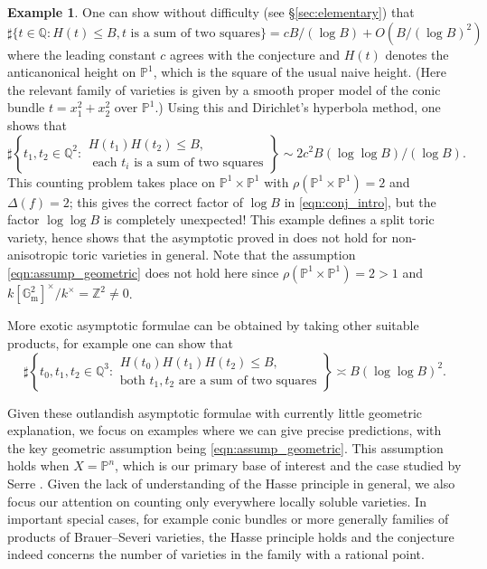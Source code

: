 \documentclass[a4paper,12pt,reqno]{amsart}
\numberwithin{equation}{section} \numberwithin{figure}{section}
\renewcommand\P{\mathbb{P}}
\newcommand\Z{\mathbb{Z}}
\newcommand\Q{\mathbb{Q}}
\newcommand\G{\mathbb{G}}
\newcommand\Gm{\G_\mathrm{m}}
\renewcommand{\leq}{\leqslant}
\renewcommand{\#}{\sharp}
\theoremstyle{definition}
\newtheorem{example}[lemma]{Example}
\numberwithin{lemma}{section}
\begin{document}
\begin{example} \label{ex:crazy}
	One can show without difficulty (see \S\ref{sec:elementary})  that
	$$\#\{ t \in \Q : H(t) \leq B, t \text{ is a sum of two squares} \} = c B/(\log B) + O(B / (\log B)^2) $$
	where the leading constant $c$ agrees with the conjecture and 
	$H(t)$ denotes the anticanonical height on $\P^1$, which is the square of the usual naive height.	
	(Here the relevant family of varieties is given by a smooth proper model of the conic bundle
	$t = x_1^2 + x_2^2$ over $\P^1$.)
	Using this and Dirichlet's hyperbola method, one shows that 
	$$\#\left\{ t_1,t_2 \in \Q^2 : 
	\begin{array}{l}
		H(t_1)H(t_2) \leq B,  \\
		\text{ each } t_i \text{ is a sum of two squares} 
	\end{array} 
	\right\} \sim 2c^2 B (\log \log B)/(\log B).$$
	This counting problem takes place on $\P^1 \times \P^1$ with $\rho(\P^1\times \P^1) = 2$
	and $\Delta(f) = 2$; this gives the correct factor of $\log B$ in
	\eqref{eqn:conj_intro}, but the factor $\log \log B$ is completely 
	unexpected! 	This example defines a split toric variety, hence shows that the
	asymptotic proved in \cite{Lou18} does not hold for non-anisotropic toric varieties in general.
	Note that the assumption \eqref{eqn:assump_geometric} does not hold here
	since $\rho(\P^1\times \P^1) = 2 > 1$ and $k[\Gm^2]^\times/k^\times = \Z^2 \neq 0$.

	
	More exotic asymptotic formulae can be obtained by taking other suitable products, for example
	one can show that
	$$\#\left\{ t_0,t_1,t_2 \in \Q^3 : 
	\begin{array}{l}
	H(t_0)H(t_1)H(t_2) \leq B, \\
	\text{both } t_1,t_2 \text{ are a sum of two squares}
	\end{array}
	\right \} \asymp B (\log \log B)^2.$$
\end{example}

 
Given these outlandish asymptotic formulae with currently little geometric explanation, we  focus on examples where we can give precise predictions, with the key geometric assumption being \eqref{eqn:assump_geometric}. This assumption holds when $X = \P^n$, which is our primary base of interest  and the case studied by Serre \cite{Ser90}. Given the lack of understanding of the Hasse principle in general, we also focus our attention on counting only everywhere locally soluble varieties. In important special cases, for example conic bundles or more generally families of products of Brauer--Severi varieties, the Hasse principle holds and the conjecture indeed concerns the number of varieties in the family with a rational point.
\end{document}
